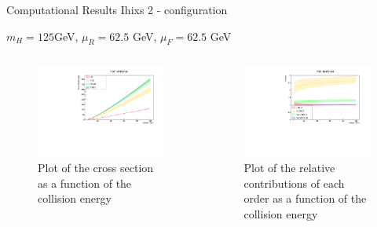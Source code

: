 \documentclass[10pt,t]{beamer}
\begin{document}
\begin{frame}{Computational Results}
    \center  Ihixs 2 - configuration
            
            $m_H = 125 $GeV, $\mu_R = 62.5$ GeV, $\mu_F = 62.5$ GeV
            \small
    \begin{columns}
        \begin{column}{0.5\textwidth}
          \begin{figure}
                \centering
                \includegraphics[scale=0.3]{Images/NNPDF40_XS.pdf}
                 \caption{ Plot of the cross section as a function of the collision energy}
           \end{figure}
            
        \end{column}


        
        \begin{column}{0.5\textwidth}
            

            \begin{figure}
                 \centering
                 \includegraphics[scale=0.3]{Images/NNPDF40_K.pdf}
                 \caption{ Plot of the relative contributions of each order as a function of the collision energy}
            \end{figure}
            

\end{column}
\end{columns}
\end{frame}
\end{document}
